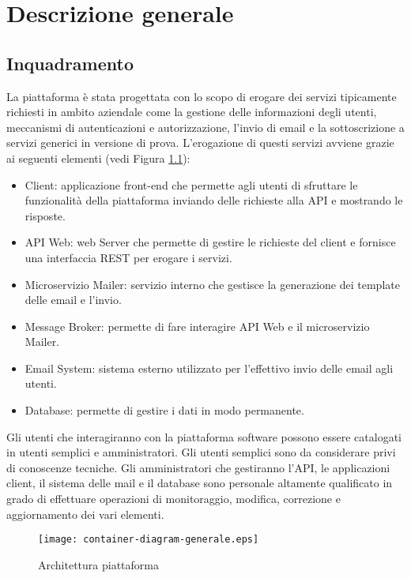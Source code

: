 \chapter{Descrizione generale}

\section{Inquadramento}
La piattaforma è stata progettata con lo scopo di erogare dei servizi tipicamente richiesti in ambito aziendale come la gestione delle
informazioni degli utenti, meccanismi di autenticazioni e autorizzazione, l'invio di
email e la sottoscrizione a servizi generici in versione di prova.
L'erogazione di questi servizi avviene grazie ai seguenti elementi (vedi Figura \ref{fig:Piattaforma}):
\begin{itemize}
    \itemsep0em
    \item Client: applicazione front-end che permette agli utenti di sfruttare le funzionalità della piattaforma inviando delle richieste alla API e mostrando le risposte.
    \item API Web: web Server che permette di gestire le richieste del client e fornisce una interfaccia REST per erogare i servizi.
    \item Microservizio Mailer: servizio interno che gestisce la generazione dei template delle email e l'invio.
    \item Message Broker: permette di fare interagire API Web e il microservizio Mailer.
    \item Email System: sistema esterno utilizzato per l'effettivo invio delle email agli utenti.
    \item Database: permette di gestire i dati in modo permanente.
\end{itemize}

Gli utenti che interagiranno con la piattaforma software possono essere catalogati in utenti semplici e amministratori.
Gli utenti semplici sono da considerare privi di conoscenze tecniche. Gli amministratori che gestiranno l’API, le applicazioni client, il sistema delle mail e il database
sono personale altamente qualificato in grado di effettuare operazioni di monitoraggio, modifica, correzione e aggiornamento dei vari elementi.

\begin{figure}[H]
    \centering
    \texttt{[image: container-diagram-generale.eps]}
    \caption{Architettura piattaforma}
    \label{fig:Piattaforma}
\end{figure}

